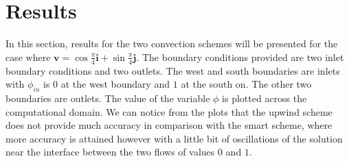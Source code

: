 \documentclass[a4paper, 11pt]{article}
\begin{document}
\section*{Results}
In this section, results for the two convection schemes will be presented for the case where $\textbf{v}=\cos\frac{\pi}{4}\textbf{i}+\sin\frac{\pi}{4}\textbf{j}$. The boundary conditions provided are two inlet boundary conditions and two outlets. The west and south boundaries are inlets with $\phi_{in}$ is $0$ at the west boundary and $1$ at the south on. The other two boundaries are outlets. The value of the variable $\phi$ is plotted across the computational domain. We can notice from the plots that the upwind scheme does not provide much accuracy in comparison with the smart scheme, where more accuracy is attained however with a little bit of oscillations of the solution near the interface between the two flows of values $0$ and $1$.
\end{document}
